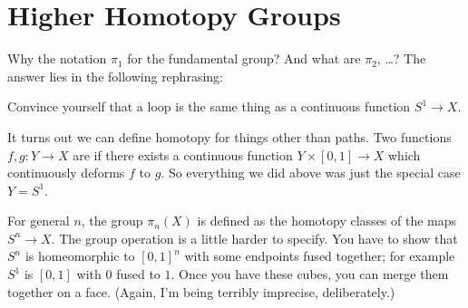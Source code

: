 %

\section{Higher Homotopy Groups}
Why the notation $\pi_1$ for the fundamental group?
And what are $\pi_2$, \dots?
The answer lies in the following rephrasing:
\begin{ques}
	Convince yourself that a loop is the same thing
	as a continuous function $S^1 \to X$.
\end{ques}
It turns out we can define homotopy for things other than paths.
Two functions $f, g : Y \to X$ are  if there exists a continuous
function $Y \times [0,1] \to X$ which continuously deforms $f$ to $g$.
So everything we did above was just the special case $Y = S^1$.

For general $n$, the group $\pi_n(X)$ is defined as the homotopy classes
of the maps $S^n \to X$.
The group operation is a little harder to specify.
You have to show that $S^n$ is homeomorphic to $[0,1]^n$ with
some endpoints fused together; for example $S^1$ is $[0,1]$ with $0$ fused to $1$.
Once you have these cubes, you can merge them together on a face.
(Again, I'm being terribly imprecise, deliberately.)

